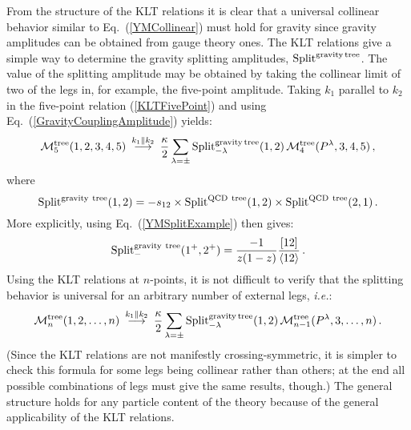 \documentclass[12pt]{livrev}
\begin{document}
{}From the structure of the KLT relations it is clear that a universal
collinear behavior similar to Eq.~(\ref{YMCollinear}) must hold for 
gravity 
since gravity amplitudes can be obtained from gauge theory ones.  The
KLT relations give a simple way to determine the gravity splitting
amplitudes, ${\mathop{\rm Split}\nolimits}^{\rm gravity\, tree}$.  The
value of the splitting amplitude may be obtained by taking the
collinear limit of two of the legs in, for example, the five-point
amplitude.  Taking $k_1$ parallel to $k_2$ in the five-point relation
(\ref{KLTFivePoint}) and using Eq.~(\ref{GravityCouplingAmplitude}) 
yields:
%
%
\begin{equation}
{\cal M}_5^{\rm tree}(1,2,3,4,5)\ 
\mathop{\longrightarrow}^{k_1 \parallel k_2}\ 
{\kappa \over 2}  \sum_{\lambda = \pm} 
{\mathop{\rm Split}\nolimits}_{-\lambda}^{\rm gravity\, tree}(1,2) \, 
   {\cal  M}_{4}^{\rm tree}(P^\lambda,3,4,5)\,,
\label{GravCollinearFive}
\end{equation}
%
%
where 
%
\begin{equation}
{\mathop{\rm Split}\nolimits}^{\rm gravity\ tree}(1,2) = 
-s_{12} \times {\mathop{\rm Split}\nolimits}^{\rm QCD\ tree}(1,2) \times 
{\mathop{\rm Split}\nolimits}^{\rm QCD\ tree}(2,1) \,.
\label{GravTreeColl}
\end{equation}
%
More explicitly, using Eq.~(\ref{YMSplitExample}) then gives: 
%
\begin{equation}
{\mathop{\rm Split}\nolimits}_{-}^{\rm gravity\ tree}(1^+,2^+) =
{ - 1\over z (1-z)} {[{1}{2}] \over \langle {1}{2}\rangle }\,.
\label{GravTreeCollExample}
\end{equation}
%
Using the KLT relations at $n$-points, it is not difficult to 
verify that the splitting behavior is universal for an 
arbitrary number of external legs, {\it i.e.}:
%
\begin{equation}
{\cal M}_n^{\rm tree}(1,2,\ldots,n)\ 
\mathop{\longrightarrow}^{k_1 \parallel k_2}\ 
{\kappa \over 2}  \sum_{\lambda = \pm} 
{\mathop{\rm Split}\nolimits}_{-\lambda}^{\rm gravity\, tree}(1,2) \, 
   {\cal  M}_{n-1}^{\rm tree}(P^\lambda,3,\ldots,n)\,.
\label{GravCollinear}
\end{equation}
%
(Since the KLT relations are not manifestly crossing-symmetric, it is
simpler to check this formula for some legs being collinear rather
than others; at the end all possible combinations of legs must give
the same results, though.)  The general structure holds for any
particle content of the theory because of the general applicability of
the KLT relations.
\end{document}
